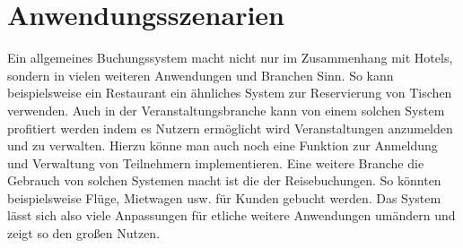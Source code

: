\chapter{Anwendungsszenarien}
Ein allgemeines Buchungssystem macht nicht nur im Zusammenhang mit Hotels, sondern in vielen weiteren Anwendungen und Branchen Sinn. So kann beispielsweise ein Restaurant ein ähnliches System zur Reservierung von Tischen verwenden. Auch in der Veranstaltungsbranche kann von einem solchen System profitiert werden indem es Nutzern ermöglicht wird Veranstaltungen anzumelden und zu verwalten. Hierzu könne man auch noch eine Funktion zur Anmeldung und Verwaltung von Teilnehmern implementieren. Eine weitere Branche die Gebrauch von solchen Systemen macht ist die der Reisebuchungen. So könnten beispielsweise Flüge, Mietwagen usw. für Kunden gebucht werden. Das System lässt sich also viele Anpassungen für etliche weitere Anwendungen umändern und zeigt so den großen Nutzen.
